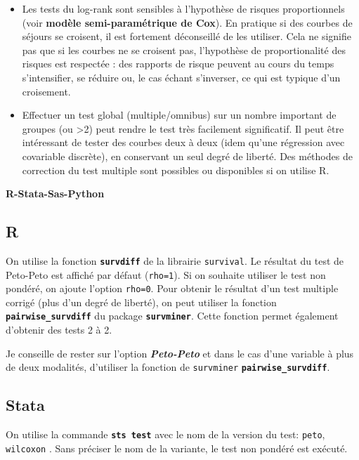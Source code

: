 \documentclass[
  12pt,
  letterpaper,
  DIV=11,
  numbers=noendperiod,
  onepage,
  openany]{scrreprt}
\begin{document}
\begin{itemize}
\item
  Les tests du log-rank sont sensibles à l'hypothèse de risques
  proportionnels (voir \textbf{modèle semi-paramétrique de Cox}). En
  pratique si des courbes de séjours se croisent, il est fortement
  déconseillé de les utiliser. Cela ne signifie pas que si les courbes
  ne se croisent pas, l'hypothèse de proportionalité des risques est
  respectée : des rapports de risque peuvent au cours du temps
  s'intensifier, se réduire ou, le cas échant s'inverser, ce qui est
  typique d'un croisement.
\item
  Effectuer un test global (multiple/omnibus) sur un nombre important de
  groupes (ou \textgreater2) peut rendre le test très facilement
  significatif. Il peut être intéressant de tester des courbes deux à
  deux (idem qu'une régression avec covariable discrète), en conservant
  un seul degré de liberté. Des méthodes de correction du test multiple
  sont possibles ou disponibles si on utilise R.
\end{itemize}

\textbf{R-Stata-Sas-Python}

\subsection{R}

On utilise la fonction \textbf{\texttt{survdiff}} de la librairie
\texttt{survival}. Le résultat du test de Peto-Peto est affiché par
défaut (\texttt{rho=1}). Si on souhaite utiliser le test non pondéré, on
ajoute l'option \texttt{rho=0}. Pour obtenir le résultat d'un test
multiple corrigé (plus d'un degré de liberté), on peut utiliser la
fonction \textbf{\texttt{pairwise\_survdiff}} du package
\textbf{\texttt{survminer}}. Cette fonction permet également d'obtenir
des tests 2 à 2.

Je conseille de rester sur l'option \textbf{\emph{Peto-Peto}} et dans le
cas d'une variable à plus de deux modalités, d'utiliser la fonction de
\texttt{survminer} \textbf{\texttt{pairwise\_survdiff}}.

\subsection{Stata}

On utilise la commande \textbf{\texttt{sts\ test}} avec le nom de la
version du test: \texttt{peto}, \texttt{wilcoxon} . Sans préciser le nom
de la variante, le test non pondéré est exécuté.
\end{document}
